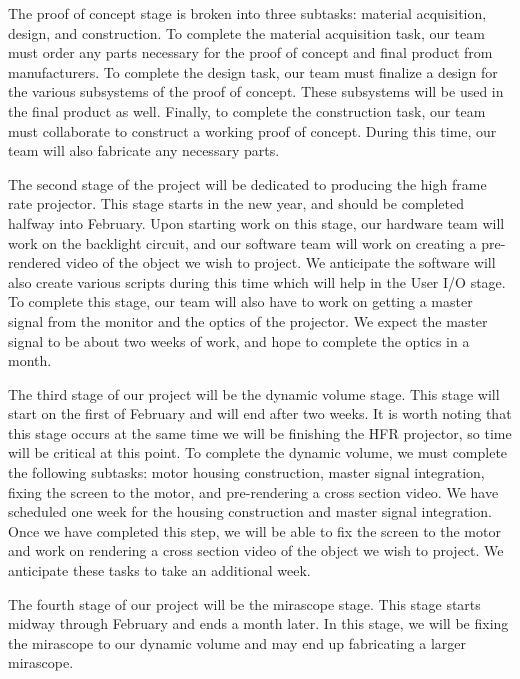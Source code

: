 \documentclass[12pt]{article}
\begin{document}
The proof of concept stage is broken into three subtasks: material acquisition, design, and construction. To complete the material acquisition task,  our team must order any parts necessary for the proof of concept and final product from manufacturers. To complete the design task, our team must finalize a design for the various subsystems of the proof of concept. These subsystems will be used in the final product as well. Finally, to complete the construction task, our team must collaborate to construct a working proof of concept. During this time, our team will also fabricate any necessary parts.

The second stage of the project will be dedicated to producing the high frame rate projector. This stage starts in the new year, and should be completed halfway into February. Upon starting work on this stage, our hardware team will work on the backlight circuit, and our software team will work on creating a pre-rendered video of the object we wish to project. We anticipate the software will also create various scripts during this time which will help in the User I/O stage. To complete this stage, our team will also have to work on getting a master signal from the monitor and the optics of the projector. We expect the master signal to be about two weeks of work, and hope to complete the optics in a month.

The third stage of our project will be the dynamic volume stage. This stage will start on the first of February and will end after two weeks. It is worth noting that this stage occurs at the same time we will be finishing the HFR projector, so time will be critical at this point. To complete the dynamic volume, we must complete the following subtasks: motor housing construction, master signal integration, fixing the screen to the motor, and pre-rendering a cross section video. We have scheduled one week for the housing construction and master signal integration. Once we have completed this step, we will be able to fix the screen to the motor and work on rendering a cross section video of the object we wish to project. We anticipate these tasks to take an additional week.

The fourth stage of our project will be the mirascope stage. This stage starts midway through February and ends a month later. In this stage, we will be fixing the mirascope to our dynamic volume and may end up fabricating a larger mirascope. 
\end{document}
